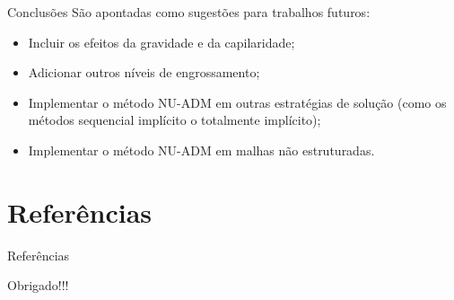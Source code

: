 \documentclass[professionalfont]{beamer}
\begin{document}
\begin{frame}{Conclusões}
    São apontadas como sugestões para trabalhos futuros:

\begin{itemize}
    \item Incluir os efeitos da gravidade e da capilaridade;
    \item Adicionar outros níveis de engrossamento;
    \item Implementar o método NU-ADM em outras estratégias de solução (como os métodos sequencial implícito o totalmente implícito);
    \item Implementar o método NU-ADM em malhas não estruturadas.
\end{itemize}
    
\end{frame}


\section{Referências}

\begin{frame}[allowframebreaks]{Referências}
    \scriptsize
    
\end{frame}

\begin{frame}
    \centering
    \LARGE
    Obrigado!!!
\end{frame}
\end{document}
